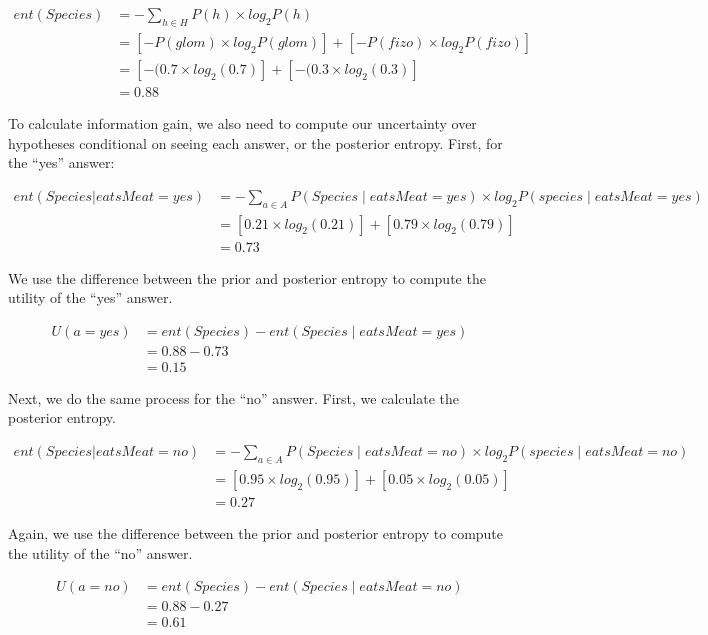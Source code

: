 \documentclass[oneside]{report}
\begin{document}
\[
\begin{aligned}
ent(Species) &= -\sum_{h\in H}{P(h) \times log_2P(h)} \\
 &= [-P(glom) \times log_2P(glom)]+[-P(fizo) \times log_2P(fizo)]\\
 &= [-(0.7 \times log_2(0.7)] + [-(0.3 \times log_2(0.3)]\\
 &= 0.88
\end{aligned}
\]

\noindent To calculate information gain, we also need to compute our
uncertainty over hypotheses conditional on seeing each answer, or the
posterior entropy. First, for the ``yes'' answer:

\[
\begin{aligned}
ent(Species|eatsMeat = yes) &= -\sum_{a\in A}P(Species \mid eatsMeat = yes) \times log_2P(species \mid eatsMeat = yes) \\
&= [0.21 \times log_2(0.21)] + [0.79 \times log_2(0.79)]\\
&=  0.73
\end{aligned}
\]

\noindent We use the difference between the prior and posterior entropy
to compute the utility of the ``yes'' answer.

\[
\begin{aligned}
U(a = yes) &= ent(Species) - ent(Species \mid eatsMeat = yes)\\
&= 0.88 - 0.73 \\
&= 0.15
\end{aligned}
\]

\noindent Next, we do the same process for the ``no'' answer. First, we
calculate the posterior entropy.

\[ 
\begin{aligned}
ent(Species|eatsMeat = no) &= -\sum_{a\in A}{P(Species \mid eatsMeat = no) \times log_2P(species \mid eatsMeat = no)}\\
&= [0.95 \times log_2(0.95)] + [0.05 \times log_2(0.05)]\\
&=  0.27
\end{aligned}
\]

\noindent Again, we use the difference between the prior and posterior
entropy to compute the utility of the ``no'' answer.

\[ 
\begin{aligned}
U(a = no) &= ent(Species) - ent(Species \mid eatsMeat = no)\\
&= 0.88 - 0.27 \\
&= 0.61
\end{aligned}
\]
\end{document}
